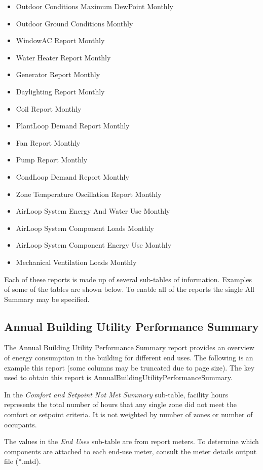 \begin{itemize}
\item
  Outdoor Conditions Maximum DewPoint Monthly
\item
  Outdoor Ground Conditions Monthly
\item
  WindowAC Report Monthly
\item
  Water Heater Report Monthly
\item
  Generator Report Monthly
\item
  Daylighting Report Monthly
\item
  Coil Report Monthly
\item
  PlantLoop Demand Report Monthly
\item
  Fan Report Monthly
\item
  Pump Report Monthly
\item
  CondLoop Demand Report Monthly
\item
  Zone Temperature Oscillation Report Monthly
\item
  AirLoop System Energy And Water Use Monthly
\item
  AirLoop System Component Loads Monthly
\item
  AirLoop System Component Energy Use Monthly
\item
  Mechanical Ventilation Loads Monthly
\end{itemize}

Each of these reports is made up of several sub-tables of information. Examples of some of the tables are shown below. To enable all of the reports the single All Summary may be specified.

\subsection{Annual Building Utility Performance Summary}\label{annual-building-utility-performance-summary}

The Annual Building Utility Performance Summary report provides an overview of energy consumption in the building for different end uses. The following is an example this report (some columns may be truncated due to page size). The key used to obtain this report is AnnualBuildingUtilityPerformanceSummary.

In the \emph{Comfort and Setpoint Not Met Summary} sub-table, facility hours represents the total number of hours that any single zone did not meet the comfort or setpoint criteria. It is not weighted by number of zones or number of occupants.

The values in the \emph{End Uses} sub-table are from report meters. To determine which components are attached to each end-use meter, consult the meter details output file (*.mtd).

